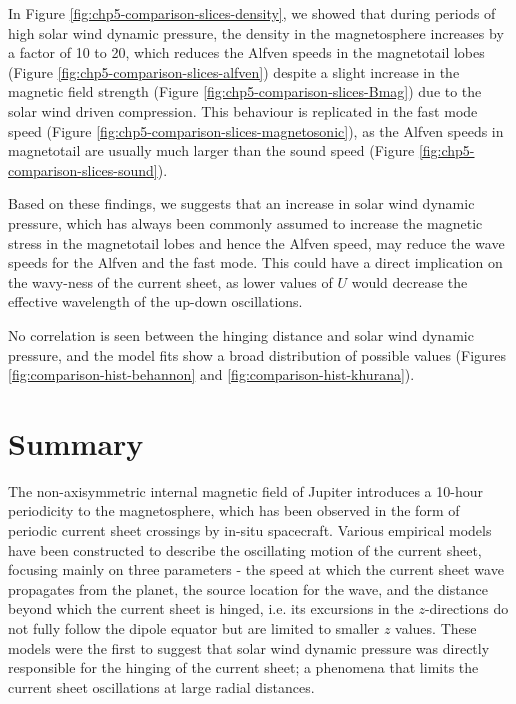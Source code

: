 In Figure \ref{fig:chp5-comparison-slices-density}, we showed that during periods of high solar wind dynamic pressure, the density in the magnetosphere increases by a factor of 10 to 20, which reduces the Alfven speeds in the magnetotail lobes (Figure \ref{fig:chp5-comparison-slices-alfven}) despite a slight increase in the magnetic field strength (Figure \ref{fig:chp5-comparison-slices-Bmag}) due to the solar wind driven compression. This behaviour is replicated in the fast mode speed (Figure \ref{fig:chp5-comparison-slices-magnetosonic}), as the Alfven speeds in magnetotail are usually much larger than the sound speed (Figure \ref{fig:chp5-comparison-slices-sound}). 

Based on these findings, we suggests that an increase in solar wind dynamic pressure, which has always been commonly assumed to increase the magnetic stress in the magnetotail lobes and hence the Alfven speed, may reduce the wave speeds for the Alfven and the fast mode. This could have a direct implication on the wavy-ness of the current sheet, as lower values of $U$ would decrease the effective wavelength of the up-down oscillations. 

No correlation is seen between the hinging distance and solar wind dynamic pressure, and the model fits show a broad distribution of possible values (Figures \ref{fig:comparison-hist-behannon} and \ref{fig:comparison-hist-khurana}). 

\section{Summary}

The non-axisymmetric internal magnetic field of Jupiter introduces a 10-hour periodicity to the magnetosphere, which has been observed in the form of periodic current sheet crossings by in-situ spacecraft. Various empirical models have been constructed to describe the oscillating motion of the current sheet, focusing mainly on three parameters - the speed at which the current sheet wave propagates from the planet, the source location for the wave, and the distance beyond which the current sheet is hinged, i.e. its excursions in the $z$-directions do not fully follow the dipole equator but are limited to smaller $z$ values. These models were the first to suggest that solar wind dynamic pressure was directly responsible for the hinging of the current sheet; a phenomena that limits the current sheet oscillations at large radial distances. 

